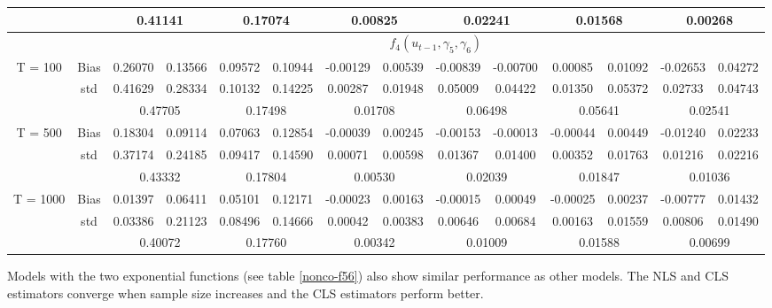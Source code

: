 \documentclass[a4paper,12pt,times,numbered,print,index]{report}
\numberwithin{equation}{section}
\begin{document}
\begin{table}[htbp]
\begin{adjustbox}{max width=\textwidth}
\begin{tabular}{cccccccccccccc}
		&       & \multicolumn{2}{c}{0.41141} & \multicolumn{2}{c}{0.17074} & \multicolumn{2}{c}{0.00825} & \multicolumn{2}{c}{0.02241} & \multicolumn{2}{c}{0.01568} & \multicolumn{2}{c}{0.00268} \\
		\midrule
		&       & \multicolumn{12}{c}{$f_4 (u_{t-1}, \gamma_5, \gamma_6)$} \\
		\midrule
		\multirow{3}[1]{*}{T = 100} & Bias  & 0.26070 & 0.13566 & 0.09572 & 0.10944 & -0.00129 & 0.00539 & -0.00839 & -0.00700 & 0.00085 & \textcolor[rgb]{ .329,  .51,  .208}{0.01092} & -0.02653 & 0.04272 \\
		& std   & 0.41629 & 0.28334 & 0.10132 & 0.14225 & 0.00287 & 0.01948 & 0.05009 & 0.04422 & 0.01350 & 0.05372 & 0.02733 & 0.04743 \\
		&       & \multicolumn{2}{c}{0.47705} & \multicolumn{2}{c}{0.17498} & \multicolumn{2}{c}{0.01708} & \multicolumn{2}{c}{0.06498} & \multicolumn{2}{c}{0.05641} & \multicolumn{2}{c}{0.02541} \\
		\multirow{3}[0]{*}{T = 500} & Bias  & 0.18304 & 0.09114 & 0.07063 & 0.12854 & -0.00039 & 0.00245 & -0.00153 & -0.00013 & -0.00044 & \textcolor[rgb]{ .329,  .51,  .208}{0.00449} & -0.01240 & 0.02233 \\
		& std   & 0.37174 & 0.24185 & 0.09417 & 0.14590 & 0.00071 & 0.00598 & 0.01367 & 0.01400 & 0.00352 & 0.01763 & 0.01216 & 0.02216 \\
		&       & \multicolumn{2}{c}{0.43332} & \multicolumn{2}{c}{0.17804} & \multicolumn{2}{c}{0.00530} & \multicolumn{2}{c}{0.02039} & \multicolumn{2}{c}{0.01847} & \multicolumn{2}{c}{0.01036} \\
		\multirow{3}[1]{*}{T = 1000} & Bias  & 0.01397 & 0.06411 & 0.05101 & 0.12171 & -0.00023 & 0.00163 & -0.00015 & 0.00049 & -0.00025 & \textcolor[rgb]{ .329,  .51,  .208}{0.00237} & -0.00777 & 0.01432 \\
		& std   & 0.03386 & 0.21123 & 0.08496 & 0.14666 & 0.00042 & 0.00383 & 0.00646 & 0.00684 & 0.00163 & 0.01559 & 0.00806 & 0.01490 \\
		&       & \multicolumn{2}{c}{0.40072} & \multicolumn{2}{c}{0.17760} & \multicolumn{2}{c}{0.00342} & \multicolumn{2}{c}{0.01009} & \multicolumn{2}{c}{0.01588} & \multicolumn{2}{c}{0.00699} \\
		\bottomrule
		\bottomrule
		\end{tabular}%
	\end{adjustbox}
	\label{nonco-f34}%
\end{table}%

Models with the two exponential functions (see table \ref{nonco-f56}) also show similar performance as other models. The NLS and CLS estimators converge when sample size increases and the CLS estimators perform better.
\end{document}
